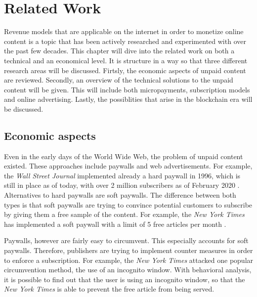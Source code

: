 \chapter{Related Work}
\label{cha:relatedwork}

Revenue models that are applicable on the internet in order to monetize online content is a topic that has been actively researched and experimented with over the past few decades. This chapter will dive into the related work on both a technical and an economical level. It is structure in a way so that three different research areas will be discussed. Firtsly, the economic aspects of unpaid content are reviewed. Secondly, an overview of the technical solutions to the unpaid content will be given. This will include both micropayments, subscription models and online advertising. Lastly, the possiblities that arise in the blockchain era will be discussed.

\section{Economic aspects}

Even in the early days of the World Wide Web, the problem of unpaid content existed.  These approaches include paywalls and web advertisements. For example, the \textit{Wall Street Journal} implemented already a hard paywall in 1996, which is still in place as of today, with over 2 million subscribers as of February 2020 \cite{firstpaywall}. 
Alternatives to hard paywalls are soft paywalls. The difference between both types is that soft paywalls are trying to convince potential customers to subscribe by giving them a free sample of the content. For example, the \textit{New York Times} has implemented a soft paywall with a limit of 5 free articles per month \cite{cook2012paying}.  %


Paywalls, however are fairly easy to circumvent. This especially accounts for soft paywalls. Therefore, publishers are trying to implement counter measures in order to enforce a subscription. For example, the \textit{New York Times} attacked one popular circumvention method, the use of an incognito window. With behavioral analysis, it is possible to find out that the user is using an incognito window, so that the \textit{New York Times} is able to prevent the free article from being served.   %

